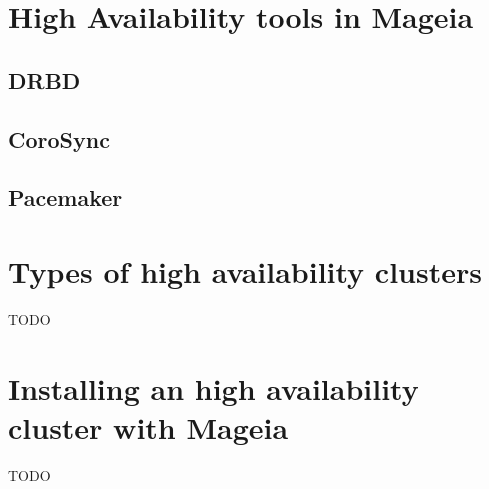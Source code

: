\documentclass[a4paper,12pt]{article}
\begin{document}
\cleardoublepage
\section{High Availability tools in Mageia}
\subsection{DRBD}
\subsection{CoroSync}
\subsection{Pacemaker}

\cleardoublepage
\section{Types of high availability clusters}
TODO

\cleardoublepage
\section{Installing an high availability cluster with Mageia}
TODO

\cleardoublepage
\end{document}
